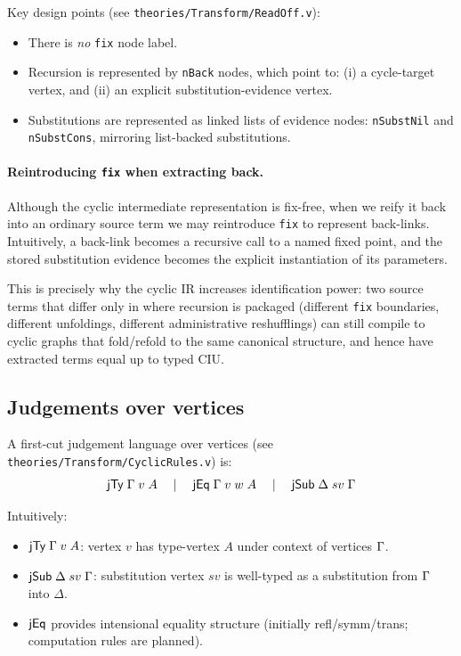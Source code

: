 Key design points (see \texttt{theories/Transform/ReadOff.v}):
\begin{itemize}
\item There is \emph{no} \texttt{fix} node label.
\item Recursion is represented by \texttt{nBack} nodes, which point to:
  (i) a cycle-target vertex, and (ii) an explicit substitution-evidence vertex.
\item Substitutions are represented as linked lists of evidence nodes:
  \texttt{nSubstNil} and \texttt{nSubstCons}, mirroring list-backed substitutions.
\end{itemize}

\paragraph{Reintroducing \texttt{fix} when extracting back.}
Although the cyclic intermediate representation is fix-free, when we reify it back into an ordinary source term we may reintroduce \texttt{fix} to represent back-links.
Intuitively, a back-link becomes a recursive call to a named fixed point, and the stored substitution evidence becomes the explicit instantiation of its parameters.

This is precisely why the cyclic IR increases identification power: two source terms that differ only in where recursion is packaged (different \texttt{fix} boundaries, different unfoldings, different administrative reshufflings) can still compile to cyclic graphs that fold/refold to the same canonical structure, and hence have extracted terms equal up to typed CIU.

\subsection{Judgements over vertices}

A first-cut judgement language over vertices (see \texttt{theories/Transform/CyclicRules.v}) is:
\[
\mathsf{jTy}\;\Gamma\;v\;A
\quad\mid\quad
\mathsf{jEq}\;\Gamma\;v\;w\;A
\quad\mid\quad
\mathsf{jSub}\;\Delta\;sv\;\Gamma
\]

Intuitively:
\begin{itemize}
\item \(\mathsf{jTy}\;\Gamma\;v\;A\): vertex \(v\) has type-vertex \(A\) under context of vertices \(\Gamma\).
\item \(\mathsf{jSub}\;\Delta\;sv\;\Gamma\): substitution vertex \(sv\) is well-typed as a substitution from \(\Gamma\) into \(\Delta\).
\item \(\mathsf{jEq}\) provides intensional equality structure (initially refl/symm/trans; computation rules are planned).
\end{itemize}

